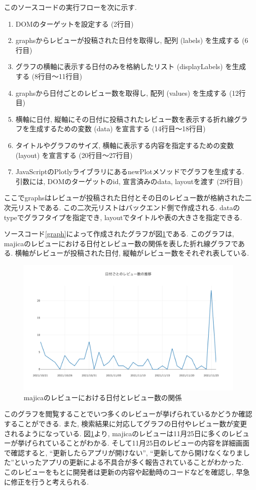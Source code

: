 このソースコードの実行フローを次に示す. 

\begin{enumerate}
  \item DOMのターゲットを設定する (2行目)
  \item graphsからレビューが投稿された日付を取得し, 配列 (labels) を生成する (6行目)
  \item グラフの横軸に表示する日付のみを格納したリスト (displayLabels) を生成する (8行目〜11行目)
  \item graphsから日付ごとのレビュー数を取得し, 配列 (values) を生成する (12行目)
  \item 横軸に日付, 縦軸にその日付に投稿されたレビュー数を表示する折れ線グラフを生成するための変数 (data) を宣言する (14行目〜18行目)
  \item タイトルやグラフのサイズ, 横軸に表示する内容を指定するための変数 (layout) を宣言する (20行目〜27行目)
  \item JavaScriptのPlotlyライブラリにあるnewPlotメソッドでグラフを生成する. 引数には, DOMのターゲットのid, 宣言済みのdata, layoutを渡す (29行目)
\end{enumerate}
ここでgraphsはレビューが投稿された日付とその日のレビュー数が格納された二次元リストである. この二次元リストはバックエンド側で作成される. 
dataのtypeでグラフタイプを指定でき, layoutでタイトルや表の大きさを指定できる. 

ソースコード\ref{graph}によって作成されたグラフが図\ref{fig:majica_graph}である. このグラフは, majicaのレビューにおける日付とレビュー数の関係を表した折れ線グラフである. 
横軸がレビューが投稿された日付, 縦軸がレビュー数をそれぞれ表している. 

\begin{figure}[H]
  \centering
  \includegraphics[scale=0.4]
    {contents/images/majica_graph.png}
  \caption{majicaのレビューにおける日付とレビュー数の関係\label{fig:majica_graph}}
\end{figure}

このグラフを閲覧することでいつ多くのレビューが挙げられているかどうか確認することができる. また, 検索結果に対応してグラフの日付やレビュー数が変更されるようになっている. 
図\ref{fig:majica_graph}より, majicaのレビューは11月25日に多くのレビューが挙げられていることがわかる. そして11月25日のレビューの内容を詳細画面で確認すると, ``更新したらアプリが開けない'', ``更新してから開けなくなりました''といったアプリの更新による不具合が多く報告されていることがわかった. 
このレビューをもとに開発者は更新の内容や起動時のコードなどを確認し, 早急に修正を行うと考えられる. 
